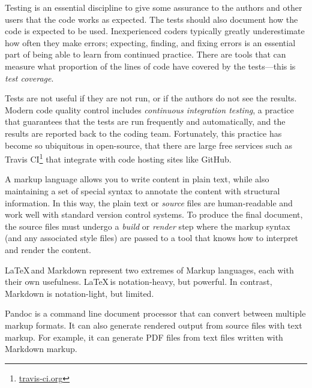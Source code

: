 Testing is an essential discipline to give some assurance to the authors and
other users that the code works as expected.
The tests should also document how the code is expected to be used.
Inexperienced coders typically greatly underestimate how often they make
errors; expecting, finding, and fixing errors is an essential part of being
able to learn from continued practice.
There are tools that can measure what proportion of the lines
of code have covered by the tests---this is \emph{test coverage}.


Tests are not useful if they are not run, or if the authors do not see the
results.  Modern code quality control includes \emph{continuous integration
testing}, a practice that guarantees that the tests are run frequently and
automatically, and the results are reported back to the coding team.
Fortunately, this practice has become so ubiquitous in open-source, that there
are large free services such as Travis
CI\footnote{\url{travis-ci.org}\label{travis-ci}} that integrate with code
hosting sites like GitHub.

%
A markup language allows you to write content in plain text, while also
maintaining a set of special syntax to annotate the content with structural
information.
In this way, the plain text or \emph{source} files are human-readable and work
well with standard version control systems.
To produce the final document, the source files must undergo a \emph{build} or
\emph{render}
step where the markup syntax (and any associated style files) are passed to a
tool that knows how to interpret and render the content.

\LaTeX\,and Markdown represent two extremes of Markup languages, each
with their own usefulness.
\LaTeX\,is notation-heavy, but powerful.
In contrast, Markdown is notation-light, but limited.

Pandoc is a command line document processor that can convert between multiple
markup formats.  It can also generate rendered output from source files with
text markup.  For example, it can generate PDF files from text files written
with Markdown markup.

